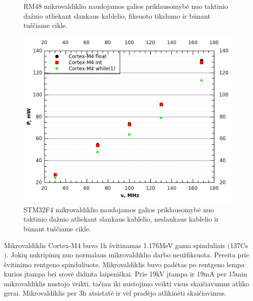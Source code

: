 \documentclass[a4paper, 12pt]{article} %
\begin{document}
\begin{onehalfspacing}
\begin{figure}[H]
\captionsetup{labelformat=numbfirst} %
\captionsetup{labelseparator=tarpas}
\caption{RM48 mikrovaldiklio naudojamos galios priklausomyb\.e nuo taktinio da\v{z}nio atliekant slankaus kablelio, fiksuoto tikslumo ir b\=unant tu\v{s}\v{c}iame cikle.}
\label{vienas}
\end{figure}
\begin{figure}[H] %
\centering %
\includegraphics[scale=0.8]{pav/M4galia.jpg} %
\captionsetup{labelformat=numbfirst} %
\captionsetup{labelseparator=tarpas}
\caption{STM32F4 mikrovaldiklio naudojamos galios priklausomyb\.e nuo taktinio da\v{z}nio atliekant slankaus kablelio, neslankaus kablelio ir b\=unant tu\v{s}\v{c}iame cikle.}
\label{vienas}
\end{figure}
Mikrovaldiklis Cortex-M4 buvo 1h \v{s}vitinamas 1.176MeV gama spinduliais $($137Cs$)$. Joki\k{u} nukripim\k{u} nuo normalaus mikrovaldiklio darbo neu\v{z}fiksuota.
Pereita prie \v{s}vitinimo rentgeno spinduliuote. Mikrovaldiklis buvo pad\.{e}tas po rentgeno lempa kurios \k{i}tampa bei srov\.{e} didinta laipsni\v{s}kai. Prie 19kV \k{i}tampa ir 19mA per 15min mikrovaldiklis nustojo veikti, ta\v{c}iau iki nustojimo veikti visus skai\v{c}iavumus atliko gerai. Mikrovaldiklis per 3h atsistat\.{e} ir v\.{e}l prad\.{e}jo atlikin\.{e}ti skai\v{c}iavimus.
\newpage

\end{onehalfspacing}
\end{document}
